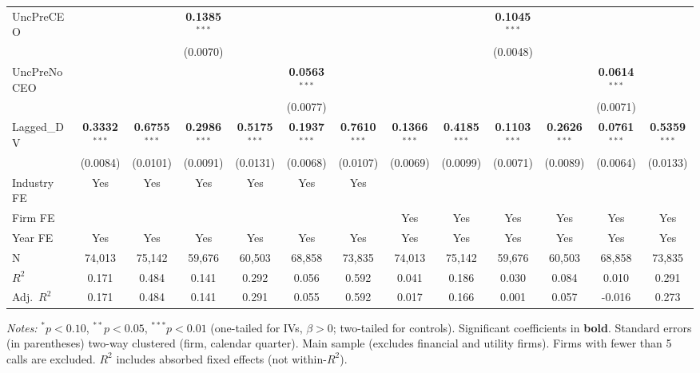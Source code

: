 \documentclass[11pt,a4paper]{article}
\begin{document}
\begin{table}[htbp]
\begin{tabular}{lcccccccccccc}
UncPreCEO &  &  & \textbf{0.1385}$^{***}$ &  &  &  &  &  & \textbf{0.1045}$^{***}$ &  &  &  \\
 &  &  & (0.0070) &  &  &  &  &  & (0.0048) &  &  &  \\
UncPreNoCEO &  &  &  &  & \textbf{0.0563}$^{***}$ &  &  &  &  &  & \textbf{0.0614}$^{***}$ &  \\
 &  &  &  &  & (0.0077) &  &  &  &  &  & (0.0071) &  \\
Lagged\_DV & \textbf{0.3332}$^{***}$ & \textbf{0.6755}$^{***}$ & \textbf{0.2986}$^{***}$ & \textbf{0.5175}$^{***}$ & \textbf{0.1937}$^{***}$ & \textbf{0.7610}$^{***}$ & \textbf{0.1366}$^{***}$ & \textbf{0.4185}$^{***}$ & \textbf{0.1103}$^{***}$ & \textbf{0.2626}$^{***}$ & \textbf{0.0761}$^{***}$ & \textbf{0.5359}$^{***}$ \\
 & (0.0084) & (0.0101) & (0.0091) & (0.0131) & (0.0068) & (0.0107) & (0.0069) & (0.0099) & (0.0071) & (0.0089) & (0.0064) & (0.0133) \\
\midrule
Industry FE & Yes & Yes & Yes & Yes & Yes & Yes &  &  &  &  &  &  \\
Firm FE &  &  &  &  &  &  & Yes & Yes & Yes & Yes & Yes & Yes \\
Year FE & Yes & Yes & Yes & Yes & Yes & Yes & Yes & Yes & Yes & Yes & Yes & Yes \\
\midrule
N & 74,013 & 75,142 & 59,676 & 60,503 & 68,858 & 73,835 & 74,013 & 75,142 & 59,676 & 60,503 & 68,858 & 73,835 \\
$R^2$ & 0.171 & 0.484 & 0.141 & 0.292 & 0.056 & 0.592 & 0.041 & 0.186 & 0.030 & 0.084 & 0.010 & 0.291 \\
Adj.~$R^2$ & 0.171 & 0.484 & 0.141 & 0.291 & 0.055 & 0.592 & 0.017 & 0.166 & 0.001 & 0.057 & -0.016 & 0.273 \\
\bottomrule
\end{tabular}
\begin{minipage}{\linewidth}
\vspace{2pt}\scriptsize
\textit{Notes:} $^{*}p<0.10$, $^{**}p<0.05$, $^{***}p<0.01$ (one-tailed for IVs, $\beta > 0$; two-tailed for controls).
 Significant coefficients in \textbf{bold}.
 Standard errors (in parentheses) two-way clustered (firm, calendar quarter).
 Main sample (excludes financial and utility firms). Firms with fewer than 5 calls are excluded.
 $R^2$ includes absorbed fixed effects (not within-$R^2$).
\end{minipage}
\end{table}
\end{document}
